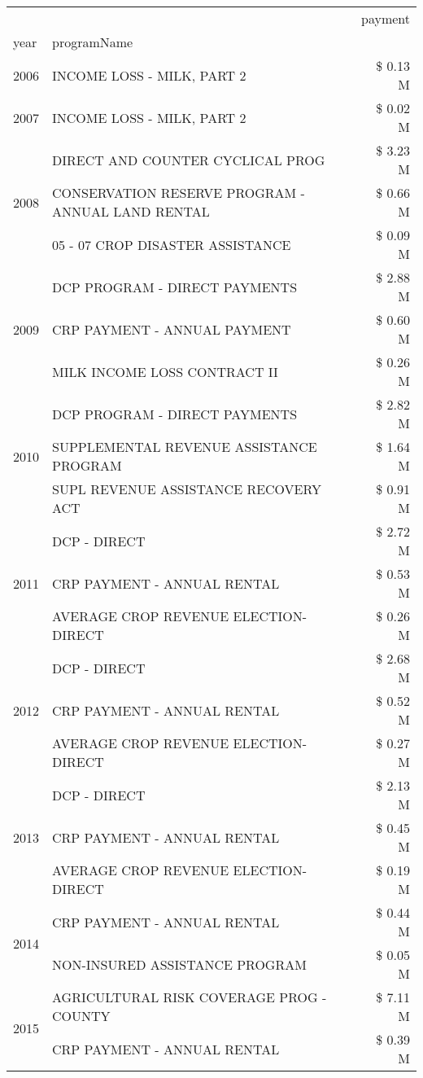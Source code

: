 \begin{tabular}{llr}
\toprule
 &  & payment \\
year & programName &  \\
\midrule
2006 & INCOME LOSS - MILK, PART 2 & \$ 0.13 M \\
\cline{1-3}
2007 & INCOME LOSS - MILK, PART 2 & \$ 0.02 M \\
\cline{1-3}
\multirow[t]{3}{*}{2008} & DIRECT AND COUNTER CYCLICAL PROG & \$ 3.23 M \\
 & CONSERVATION RESERVE PROGRAM - ANNUAL LAND RENTAL & \$ 0.66 M \\
 & 05 - 07 CROP DISASTER ASSISTANCE & \$ 0.09 M \\
\cline{1-3}
\multirow[t]{3}{*}{2009} & DCP PROGRAM - DIRECT PAYMENTS & \$ 2.88 M \\
 & CRP PAYMENT - ANNUAL PAYMENT & \$ 0.60 M \\
 & MILK INCOME LOSS CONTRACT II & \$ 0.26 M \\
\cline{1-3}
\multirow[t]{3}{*}{2010} & DCP PROGRAM - DIRECT PAYMENTS & \$ 2.82 M \\
 & SUPPLEMENTAL REVENUE ASSISTANCE PROGRAM & \$ 1.64 M \\
 & SUPL REVENUE ASSISTANCE RECOVERY ACT & \$ 0.91 M \\
\cline{1-3}
\multirow[t]{3}{*}{2011} & DCP - DIRECT & \$ 2.72 M \\
 & CRP PAYMENT - ANNUAL RENTAL & \$ 0.53 M \\
 & AVERAGE CROP REVENUE ELECTION-DIRECT & \$ 0.26 M \\
\cline{1-3}
\multirow[t]{3}{*}{2012} & DCP - DIRECT & \$ 2.68 M \\
 & CRP PAYMENT - ANNUAL RENTAL & \$ 0.52 M \\
 & AVERAGE CROP REVENUE ELECTION-DIRECT & \$ 0.27 M \\
\cline{1-3}
\multirow[t]{3}{*}{2013} & DCP - DIRECT & \$ 2.13 M \\
 & CRP PAYMENT - ANNUAL RENTAL & \$ 0.45 M \\
 & AVERAGE CROP REVENUE ELECTION-DIRECT & \$ 0.19 M \\
\cline{1-3}
\multirow[t]{2}{*}{2014} & CRP PAYMENT - ANNUAL RENTAL & \$ 0.44 M \\
 & NON-INSURED ASSISTANCE PROGRAM & \$ 0.05 M \\
\cline{1-3}
\multirow[t]{3}{*}{2015} & AGRICULTURAL RISK COVERAGE PROG - COUNTY & \$ 7.11 M \\
 & CRP PAYMENT - ANNUAL RENTAL & \$ 0.39 M \\

\end{tabular}
